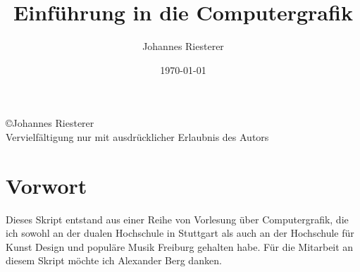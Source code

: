 \title{Einführung in die Computergrafik}
\author{Johannes Riesterer}
\date{\today}
\maketitle\thispagestyle{empty}
\newpage 
\begin{center}
\large
 \copyright Johannes Riesterer \\
Vervielfältigung nur mit ausdrücklicher Erlaubnis des Autors
\end{center}
\thispagestyle{empty}
\newpage

\section*{Vorwort}
\mbox{}\thispagestyle{empty}

Dieses Skript entstand aus einer Reihe von Vorlesung über Computergrafik, die ich sowohl an der dualen Hochschule in Stuttgart als auch an der Hochschule für 
Kunst Design und populäre Musik Freiburg gehalten habe. Für die Mitarbeit an diesem Skript möchte ich Alexander Berg  danken.

\newpage
